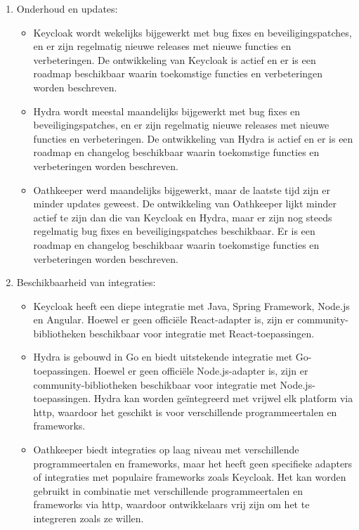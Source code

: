 \begin{enumerate}
  \item Onderhoud en updates:
  \begin{itemize}
    \item Keycloak wordt wekelijks bijgewerkt met bug fixes en beveiligingspatches, en er zijn regelmatig nieuwe releases met nieuwe functies en verbeteringen. De ontwikkeling van Keycloak is actief en er is een roadmap beschikbaar waarin toekomstige functies en verbeteringen worden beschreven.
    \item Hydra wordt meestal maandelijks bijgewerkt met bug fixes en beveiligingspatches, en er zijn regelmatig nieuwe releases met nieuwe functies en verbeteringen. De ontwikkeling van Hydra is actief en er is een roadmap en changelog beschikbaar waarin toekomstige functies en verbeteringen worden beschreven.
    \item Oathkeeper werd maandelijks bijgewerkt, maar de laatste tijd zijn er minder updates geweest. De ontwikkeling van Oathkeeper lijkt minder actief te zijn dan die van Keycloak en Hydra, maar er zijn nog steeds regelmatig bug fixes en beveiligingspatches beschikbaar. Er is een roadmap en changelog beschikbaar waarin toekomstige functies en verbeteringen worden beschreven.
  \end{itemize}
  
  \item Beschikbaarheid van integraties:
  \begin{itemize}
    \item Keycloak heeft een diepe integratie met Java, Spring Framework, Node.js en Angular. Hoewel er geen officiële React-adapter is, zijn er community-bibliotheken beschikbaar voor integratie met React-toepassingen.
    \item Hydra is gebouwd in Go en biedt uitstekende integratie met Go-toepassingen. Hoewel er geen officiële Node.js-adapter is, zijn er community-bibliotheken beschikbaar voor integratie met Node.js-toepassingen. Hydra kan worden geïntegreerd met vrijwel elk platform via \gls{http}, waardoor het geschikt is voor verschillende programmeertalen en frameworks.
    \item Oathkeeper biedt integraties op laag niveau met verschillende programmeertalen en frameworks, maar het heeft geen specifieke adapters of integraties met populaire frameworks zoals Keycloak. Het kan worden gebruikt in combinatie met verschillende programmeertalen en frameworks via \gls{http}, waardoor ontwikkelaars vrij zijn om het te integreren zoals ze willen.
  \end{itemize}
  

\end{enumerate}
